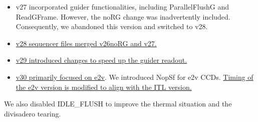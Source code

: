 \begin{itemize}
\tightlist
\item
  v27 incorporated guider functionalities, including ParallelFlushG and
  ReadGFrame. However, the noRG change was inadvertently included.
  Consequently, we abandoned this version and switched to v28.
\item  \href{https://rubinobs.atlassian.net/browse/LSSTCAM-5}{v28 sequencer files merged v26noRG and
  v27.}
\item\href{https://rubinobs.atlassian.net/browse/LSSTCAM-34}{v29 introduced changes to speed up the guider readout.}
\item
  \href{https://github.com/lsst-camera-dh/sequencer-files/pull/17}{v30 primarily focused on e2v}. We introduced NopSf
  for e2v CCDs. \href{https://github.com/lsst-camera-dh/sequencer-files/pull/18}{Timing of the e2v version is modified to align with the ITL version.}
\end{itemize}

We also disabled IDLE\_FLUSH to improve the thermal situation and the divisadero tearing.

\clearpage